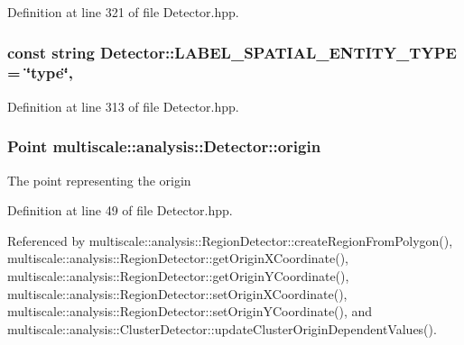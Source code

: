 Definition at line 321 of file Detector.\-hpp.

\hypertarget{classmultiscale_1_1analysis_1_1Detector_ac93f1fd6bdc7250b890480c7d5acf5b0}{
\subsubsection[{L\-A\-B\-E\-L\-\_\-\-S\-P\-A\-T\-I\-A\-L\-\_\-\-E\-N\-T\-I\-T\-Y\-\_\-\-T\-Y\-P\-E}]{\setlength{\rightskip}{0pt plus 5cm}const string Detector\-::\-L\-A\-B\-E\-L\-\_\-\-S\-P\-A\-T\-I\-A\-L\-\_\-\-E\-N\-T\-I\-T\-Y\-\_\-\-T\-Y\-P\-E = \char`\"{}type\char`\"{}\hspace{0.3cm}{\ttfamily [static]}, {\ttfamily [protected]}}}\label{classmultiscale_1_1analysis_1_1Detector_ac93f1fd6bdc7250b890480c7d5acf5b0}


Definition at line 313 of file Detector.\-hpp.

\hypertarget{classmultiscale_1_1analysis_1_1Detector_a002237e2ad684975a7c8b1e12dd7d780}{
\subsubsection[{origin}]{\setlength{\rightskip}{0pt plus 5cm}Point multiscale\-::analysis\-::\-Detector\-::origin\hspace{0.3cm}{\ttfamily [protected]}}}\label{classmultiscale_1_1analysis_1_1Detector_a002237e2ad684975a7c8b1e12dd7d780}
The point representing the origin 

Definition at line 49 of file Detector.\-hpp.



Referenced by multiscale\-::analysis\-::\-Region\-Detector\-::create\-Region\-From\-Polygon(), multiscale\-::analysis\-::\-Region\-Detector\-::get\-Origin\-X\-Coordinate(), multiscale\-::analysis\-::\-Region\-Detector\-::get\-Origin\-Y\-Coordinate(), multiscale\-::analysis\-::\-Region\-Detector\-::set\-Origin\-X\-Coordinate(), multiscale\-::analysis\-::\-Region\-Detector\-::set\-Origin\-Y\-Coordinate(), and multiscale\-::analysis\-::\-Cluster\-Detector\-::update\-Cluster\-Origin\-Dependent\-Values().

